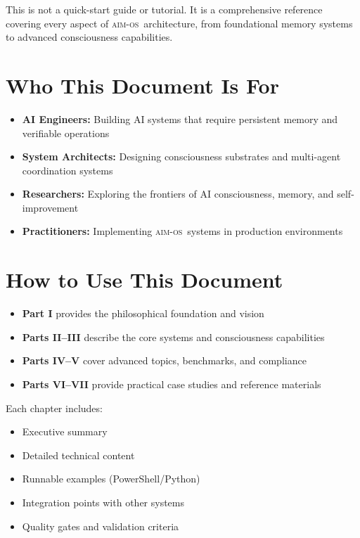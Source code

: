 \documentclass[11pt,a4paper,twoside]{book}
\newcommand{\aimos}{\textsc{aim-os}}
\theoremstyle{definition}
\theoremstyle{remark}
\begin{document}
This is not a quick-start guide or tutorial. It is a comprehensive reference covering every aspect of \aimos\ architecture, from foundational memory systems to advanced consciousness capabilities.

\section*{Who This Document Is For}

\begin{itemize}
    \item \textbf{AI Engineers:} Building AI systems that require persistent memory and verifiable operations
    \item \textbf{System Architects:} Designing consciousness substrates and multi-agent coordination systems
    \item \textbf{Researchers:} Exploring the frontiers of AI consciousness, memory, and self-improvement
    \item \textbf{Practitioners:} Implementing \aimos\ systems in production environments
\end{itemize}

\section*{How to Use This Document}

\begin{itemize}
    \item \textbf{Part I} provides the philosophical foundation and vision
    \item \textbf{Parts II--III} describe the core systems and consciousness capabilities
    \item \textbf{Parts IV--V} cover advanced topics, benchmarks, and compliance
    \item \textbf{Parts VI--VII} provide practical case studies and reference materials
\end{itemize}

Each chapter includes:
\begin{itemize}
    \item Executive summary
    \item Detailed technical content
    \item Runnable examples (PowerShell/Python)
    \item Integration points with other systems
    \item Quality gates and validation criteria
\end{itemize}
\end{document}
